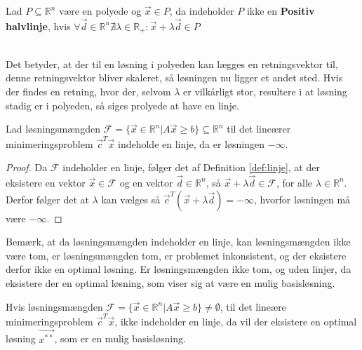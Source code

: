 \begin{defn} [Linje v2]
Lad $P\subseteq \mathds{R}^n $ være en polyede og $\vec{x} \in P$, da indeholder $P$ ikke en \textbf{Positiv halvlinje}, hvis $\forall \vec{d} \in \mathds{R}^n \nexists \lambda \in \mathds{R}_+ : \vec{x}+\lambda \vec{d} \in P$
\end{defn}
\\
Det betyder, at der til en løsning i polyeden kan lægges en retningsvektor til, denne retningsvektor bliver skaleret, så løsningen nu ligger et andet sted. Hvis der findes en retning, hvor der, selvom $\lambda$ er vilkårligt stor, resultere i at løsning stadig er i polyeden, så siges prolyede at have en linje.
\begin{prop}
Lad løsningsmængden $\mathcal{F} = \{ \vec{x} \in \mathds{R}^n| A \vec{x} \geq b \} \subseteq \mathds{R}^n $  til det lineærer minimeringsproblem $\vec{c}^T\vec{x}$ indeholde en linje, da er løsningen $-\infty$.
\end{prop}
\begin{proof}
Da $\mathcal{F}$ indeholder en linje, følger det af Definition \ref{def:linje}, at der eksistere en vektor $\vec{x} \in \mathcal{F}$ og en vektor $\vec{d} \in \mathds{R}^n$, så $\vec{x}+\lambda \vec{d} \in \mathcal{F}$, for alle $\lambda \in \mathds{R}^n$. 
Derfor følger det at $\lambda$ kan vælges så $\vec{c}^T(\vec{x}+\lambda\vec{d}) = - \infty$, hvorfor løsningen må være $-\infty$.
\end{proof}
Bemærk, at da løsningsmængden indeholder en linje, kan løsningsmængden ikke være tom, er løsningsmængden tom, er problemet inkonsistent, og der eksistere derfor ikke en optimal løsning. 
Er løsningsmængden ikke tom, og uden linjer, da eksistere der en optimal løsning, som viser sig at være en mulig basisløsning.
\begin{stn}
Hvis løsningsmængden $\mathcal{F} =\{\vec{x} \in \mathds{R}^n| A \vec{x} \geq b \} \neq \emptyset$, til det lineære minimeringsproblem $\vec{c}^T\vec{x}$, ikke indeholder en linje, da vil der eksistere en optimal løsning $\vec{x^{**}}$, som er en mulig basisløsning.
\label{stn:eksistens}
\end{stn}

